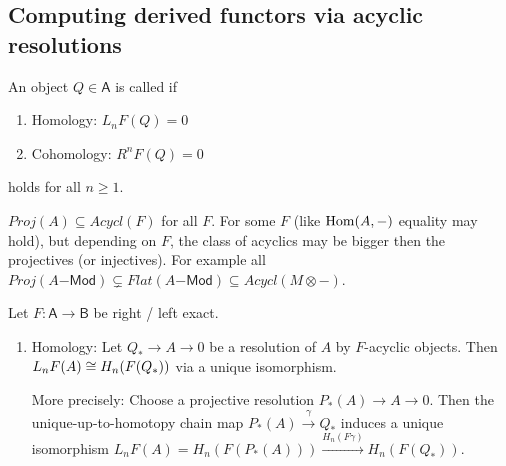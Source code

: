 \documentclass[fontsize=11pt,fleqn,a4paper]{scrartcl}
\begin{document}
\subsection{Computing derived functors via acyclic resolutions}

\begin{definition}
An object $Q\in\mathsf{A}$ is called  if
\begin{enumerate}
\item Homology: $L_n F(Q) = 0$
\item Cohomology: $R^n F(Q) = 0$
\end{enumerate}
holds for all $n\geq 1$.
\end{definition}

\begin{remark}
$Proj(A) \subseteq Acycl(F)$ for all $F$. For some $F$ (like $\operatorname{Hom}(A,-)$ equality may hold), but depending on $F$, the class of acyclics may be bigger then the projectives (or injectives). For example all $Proj(A\mathsf{-Mod}) \subsetneq Flat(A\mathsf{-Mod}) \subseteq Acycl(M\otimes-)$.
\end{remark}

\begin{theorem}
Let $F:\mathsf{A}\to\mathsf{B}$ be right / left exact.

\begin{enumerate}
\item Homology: Let $Q_\ast \to A\to 0$ be a resolution of $A$ by $F$-acyclic objects. Then $L_nF(A) \cong H_n(F(Q_\ast))$ via a unique isomorphism.

More precisely: Choose a projective resolution $P_\ast(A) \to A \to 0$. Then the unique-up-to-homotopy chain map $P_\ast(A)\xrightarrow{\gamma} Q_\ast$ induces a unique isomorphism $L_nF(A) = H_n(F(P_\ast(A))) \xrightarrow{H_n(F\gamma)} H_n(F(Q_\ast))$.
\end{enumerate}
\end{theorem}
\end{document}
